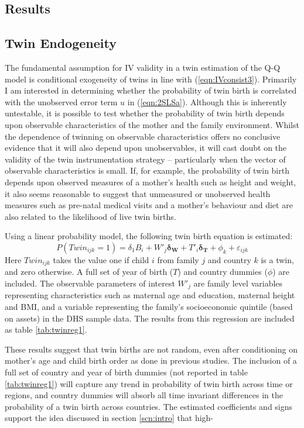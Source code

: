 \documentclass{article}[11pt,subeqn]
\newcommand{\vect}[1]{\mathbf{#1}}
\begin{document}
\begin{spacing}{1.5}
\section{Results}
\label{scn:results}
\subsection{Twin Endogeneity}
\label{scn:twinendog}
The fundamental assumption for IV validity in a twin estimation of the Q-Q model is conditional exogeneity of twins in line with (\ref{eqn:IVconsist3}).
Primarily I am interested in determining whether the probability of twin birth is correlated with the unobserved error term $u$ in (\ref{eqn:2SLSa}).  
Although this is inherently untestable, it is possible to test whether the probability of twin birth depends upon observable characteristics of the mother 
and the family environment.  Whilst the dependence of twinning on observable characteristics offers no conclusive evidence that it will also 
depend upon unobservables, it will cast doubt on the validity of the twin instrumentation strategy -- particularly when the vector of observable 
characteristics is small.  If, for example, the probability of twin birth depends upon observed measures of a mother's health such as height and weight, 
it also seems reasonable to suggest that unmeasured or unobserved health measures such as pre-natal medical visits and a mother's behaviour and diet
are also related to the likelihood of live twin births. 
 
Using a linear probability model, the following twin birth equation is estimated: 
\begin{equation}
\label{eqn:twinpred}
P(Twin_{ijk}=1)=\delta_1 B_i + W'_j\vect{\delta_\vect{W}}+ T'_{i}\vect{\delta_\vect{T}} +  \phi_k + \varepsilon_{ijk}
\end{equation}
Here $Twin_{ijk}$ takes the value one if child $i$ from family $j$ and country $k$ is a twin, and zero otherwise.  A full set of year of birth ($T$) and country
dummies ($\phi$) are included.  The observable parameters of interest $W'_j$ are family level variables representing characteristics such as maternal age and
education, maternal height and BMI, and a variable representing the family's socioeconomic quintile (based on assets) in the DHS sample data. The results from this 
regression are included as table \ref{tab:twinreg1}.

These results suggest that twin births are not random, even after conditioning on mother's age and child birth order as done in previous studies.  The
inclusion of a full set of country and year of birth dummies (not reported in table \ref{tab:twinreg1}) will capture any trend in
probability of twin birth across time or regions, and country dummies will absorb all time invariant differences in the probability of a twin birth across countries.  
The estimated coefficients and signs support the idea discussed in section \ref{scn:intro} that high-


\end{spacing}
\end{document}
